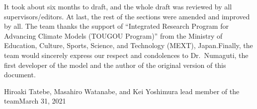 It took about six months to draft, and the whole draft was reviewed by
all supervisors/editors. At last, the rest of the sections were amended
and improved by all. The team thanks the support of ``Integrated
Research Program for Advancing Climate Models (TOUGOU Program)'' from
the Ministry of Education, Culture, Sports, Science, and Technology
(MEXT), Japan.Finally, the team would sincerely express our respect and
condolences to Dr.~Numaguti, the first developer of the model and the
author of the original version of this document.

Hiroaki Tatebe, Masahiro Watanabe, and Kei Yoshimura lead member of the
teamMarch 31, 2021
